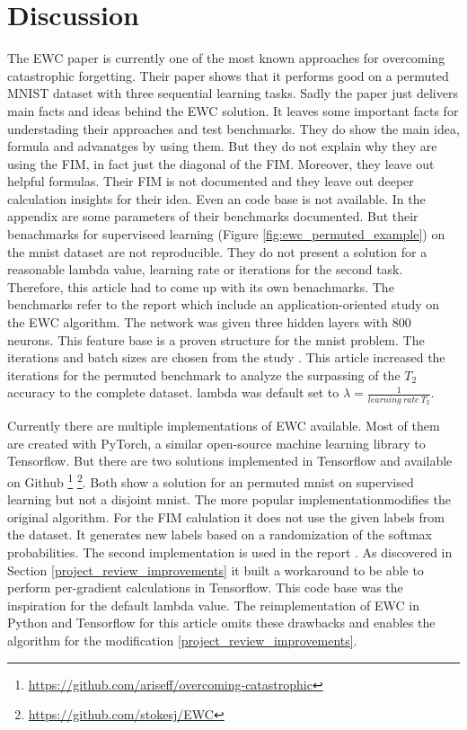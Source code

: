 \chapter{Discussion}

The EWC paper is currently one of the most known approaches for overcoming catastrophic forgetting.
Their paper shows that it performs good on a permuted MNIST dataset with three sequential learning tasks.
\newline
Sadly the paper just delivers main facts and ideas behind the EWC solution.
It leaves some important facts for understading their approaches and test benchmarks.
They do show the main idea, formula and advanatges by using them.
But they do not explain why they are using the FIM, in fact just the diagonal of the FIM.
Moreover, they leave out helpful formulas.
Their FIM is not documented and they leave out deeper calculation insights for their idea.
Even an code base is not available.
In the appendix are some parameters of their benchmarks documented.
But their benachmarks for superviseed learning (Figure \ref{fig:ewc_permuted_example}) on the mnist dataset are not reproducible.
They do not present a solution for a reasonable lambda value, learning rate or iterations for the second task.
Therefore, this article had to come up with its own benachmarks.
The benchmarks refer to the report \cite{cf_application_oriented_study} which include an application-oriented study on the EWC algorithm.
The network was given three hidden layers with 800 neurons.
This feature base is a proven structure for the mnist problem.
The iterations and batch sizes are chosen from the study \cite{cf_application_oriented_study}.
This article increased the iterations for the permuted benchmark to analyze the surpassing of the $T_2$ accuracy to the complete dataset.
lambda was default set to $\lambda = \frac{1}{learning \: rate \: T_2}$.

Currently there are multiple implementations of EWC available.
Most of them are created with PyTorch, a similar open-source machine learning library to Tensorflow.
But there are two solutions implemented in Tensorflow and available on Github
\footnote[1]{\url{https://github.com/ariseff/overcoming-catastrophic}}
\footnote[2]{\url{https://github.com/stokesj/EWC}}.
Both show a solution for an permuted mnist on supervised learning but not a disjoint mnist.
The more popular implementation\footnotemark[1] modifies the original algorithm.
For the FIM calulation it does not use the given labels from the dataset.
It generates new labels based on a randomization of the softmax probabilities.
The second implementation \footnotemark[2] is used in the report \cite{cf_application_oriented_study}.
As discovered in Section \ref{project_review_improvements} it built a workaround to be able to perform per-gradient calculations in Tensorflow.
This code base was the inspiration for the default lambda value.
\newline
The reimplementation of EWC in Python and Tensorflow for this article omits these drawbacks and enables the algorithm for the modification \ref{project_review_improvements}.

